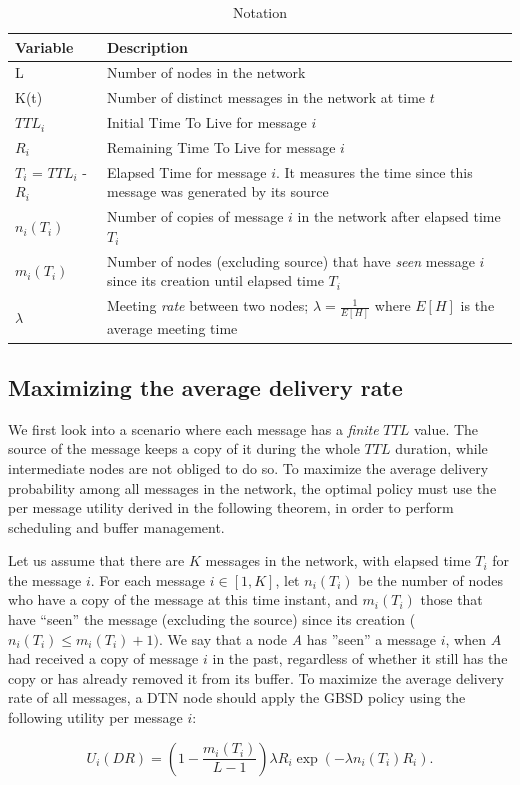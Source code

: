 \begin{table}
\caption{Notation}
\centering
\label{table:notation}
\footnotesize
\begin{tabular}{|p{2.8cm}|p{7.7cm}|}
\hline
\bfseries Variable & \bfseries Description\\
\hline
L & Number of nodes in the network\\
\hline
K(t) & Number of distinct messages in the network at time $t$\\
\hline
$TTL_i$ & Initial Time To Live for message $i$\\
\hline
$R_i$ & Remaining Time To Live for message $i$\\
\hline
$T_i$ = $TTL_i$ - $R_i$ & Elapsed Time for message $i$. It measures the time since this message was generated by its source\\
\hline
$n_i(T_i)$ & Number of copies of message $i$ in the network after elapsed time $T_i$\\
\hline $m_i(T_i)$ & Number of nodes (excluding source) that
have \emph{seen} message $i$ since its creation until elapsed time $T_i$\\
\hline
$\lambda$ & Meeting \emph{rate} between two nodes; $\lambda = \frac{1}{E[H]}$ where $E[H]$ is the average meeting time\\
\hline
\end{tabular}
\end{table}
\normalsize

\subsection{Maximizing the average delivery rate}
\label{subsec:MaxAvgDeliveryRate}
We first look into a scenario where each message has a \emph{finite} $TTL$ value. The source of the message keeps a copy of it during the whole $TTL$ duration, while intermediate nodes are not obliged to do so. To maximize the average delivery probability among all messages in the network, the optimal policy must use the per message utility derived in the following theorem, in order to perform scheduling and buffer management.

\begin{theorem}\label{th:delivery-rate}
Let us assume that there are $K$ messages in the network, with
elapsed time $T_{i}$ for the message $i$. For each message $i \in [1,K]$, let $n_i(T_i)$ be the number of nodes who have a copy of the message at this time instant, and $m_i(T_i)$ those that have ``seen'' the message (excluding the source) since its creation ($n_i(T_i) \leqslant m_i(T_i)+1)$. We say that a node \emph{A} has ''seen'' a message $i$, when $A$ had received a copy of message $i$ in the past, regardless of whether it still has the copy or has already removed it from its buffer. To maximize the average delivery rate of all messages, a DTN node should apply the GBSD policy using the following utility per message $i$:

\begin{equation}\label{eq:GBSD-delivery-rate}
U_{i}(DR) = (1-\frac{m_i(T_i)}{L-1})\lambda R_i\exp(-\lambda n_i(T_i) R_i).
\end{equation}
\end{theorem}

